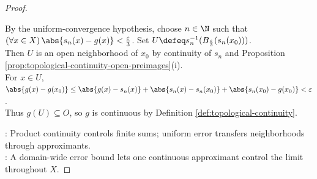 \begin{proposition}
\begin{proof}
\begin{enumerate}[label=(\roman*)]
By the uniform-convergence hypothesis, choose $n\in\N$ such that $(\forall x\in X)\,\abs{s_n(x)-g(x)}<\frac{\varepsilon}{3}$. Set $U\defeq s_n^{-1}(B_{\frac{\varepsilon}{3}}(s_n(x_0)))$.\\
Then $U$ is an open neighborhood of $x_0$ by continuity of $s_n$ and Proposition \ref{prop:topological-continuity-open-preimages}(i).\\
For $x\in U$, $\abs{g(x)-g(x_0)}\leq\abs{g(x)-s_n(x)}+\abs{s_n(x)-s_n(x_0)}+\abs{s_n(x_0)-g(x_0)}<\varepsilon$.\\
Thus $g(U)\subseteq O$, so $g$ is continuous by Definition \ref{def:topological-continuity}.
\end{enumerate}
: Product continuity controls finite sums; uniform error transfers neighborhoods through approximants.\\
: A domain-wide error bound lets one continuous approximant control the limit throughout $X$.
\end{proof}
\end{proposition}

